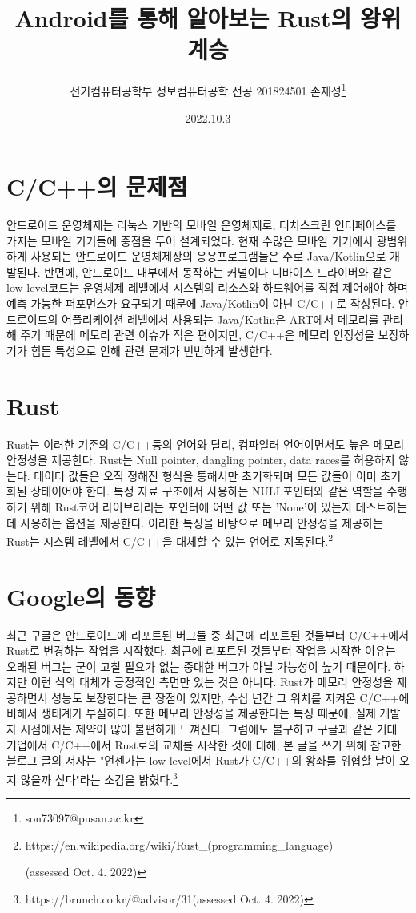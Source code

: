 \documentclass{article}
\title{Android를 통해 알아보는 Rust의 왕위계승}
\author{전기컴퓨터공학부 정보컴퓨터공학 전공 201824501 손재성\footnote{son73097@pusan.ac.kr}}
\date{2022.10.3}
\begin{document}
\maketitle
\section{C/C++의 문제점}
안드로이드 운영체제는 리눅스 기반의 모바일 운영체제로, 터치스크린 인터페이스를 가지는 모바일 기기들에 중점을 두어 설계되었다.
현재 수많은 모바일 기기에서 광범위하게 사용되는 안드로이드 운영체제상의 응용프로그램들은 주로 Java/Kotlin으로 개발된다.
반면에, 안드로이드 내부에서 동작하는 커널이나 디바이스 드라이버와 같은 low-level코드는 운영체제 레벨에서 시스템의 리소스와 하드웨어를 직접 제어해야 하며 예측 가능한
퍼포먼스가 요구되기 때문에 Java/Kotlin이 아닌 C/C++로 작성된다. 안드로이드의 어플리케이션 레벨에서 사용되는 Java/Kotlin은 ART에서 메모리를 관리해 주기 때문에 메모리 관련 이슈가 적은 편이지만,
C/C++은 메모리 안정성을 보장하기가 힘든 특성으로 인해 관련 문제가 빈번하게 발생한다.
\section{Rust}
Rust는 이러한 기존의 C/C++등의 언어와 달리, 컴파일러 언어이면서도 높은 메모리 안정성을 제공한다. Rust는 Null pointer, dangling pointer, data races를 허용하지 않는다.
데이터 값들은 오직 정해진 형식을 통해서만 초기화되며 모든 값들이 이미 초기화된 상태이어야 한다. 특정 자료 구조에서 사용하는 NULL포인터와 같은 역할을 수행하기 위해 Rust코어 라이브러리는 포인터에 어떤 값 또는 'None'이 있는지 테스트하는 데 사용하는 옵션을 제공한다. 이러한 특징을 바탕으로 메모리 안정성을 제공하는 Rust는 시스템 레벨에서 C/C++을 대체할 수 있는 언어로 지목된다.\footnote{https://en.wikipedia.org/wiki/Rust\_(programming\_language)

(assessed Oct. 4. 2022)}
\section{Google의 동향}
최근 구글은 안드로이드에 리포트된 버그들 중 최근에 리포트된 것들부터 C/C++에서 Rust로 변경하는 작업을 시작했다. 최근에 리포트된 것들부터 작업을 시작한 이유는 오래된 버그는 굳이 
고칠 필요가 없는 중대한 버그가 아닐 가능성이 높기 때문이다. 하지만 이런 식의 대체가 긍정적인 측면만 있는 것은 아니다. Rust가 메모리 안정성을 제공하면서 성능도 보장한다는 큰 장점이 있지만,
수십 년간 그 위치를 지켜온 C/C++에 비해서 생태계가 부실하다. 또한 메모리 안정성을 제공한다는 특징 때문에, 실제 개발자 시점에서는 제약이 많아 불편하게 느껴진다.
그럼에도 불구하고 구글과 같은 거대 기업에서 C/C++에서 Rust로의 교체를 시작한 것에 대해, 
본 글을 쓰기 위해 참고한 블로그 글의 저자는 "언젠가는 low-level에서 Rust가 C/C++의 왕좌를 위협할 날이 오지 않을까 싶다"라는 소감을 밝혔다.\footnote{https://brunch.co.kr/@advisor/31(assessed Oct. 4. 2022)}
\end{document}
